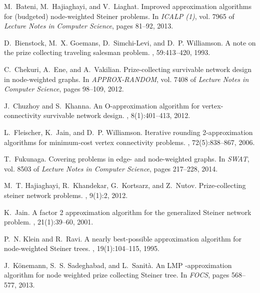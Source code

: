 \documentclass[11pt]{article}
\begin{document}
\begin{thebibliography}{10}

M.~Bateni, M.~Hajiaghayi, and V.~Liaghat.
\newblock Improved approximation algorithms for (budgeted) node-weighted
  {S}teiner problems.
\newblock In {\em ICALP (1)}, vol. 7965 of {\em Lecture Notes in Computer
  Science}, pages 81--92, 2013.

D.~Bienstock, M.~X. Goemans, D.~Simchi-Levi, and D.~P. Williamson.
\newblock A note on the prize collecting traveling salesman problem.
, 59:413--420, 1993.

C.~Chekuri, A.~Ene, and A.~Vakilian.
\newblock Prize-collecting survivable network design in node-weighted graphs.
\newblock In {\em APPROX-RANDOM}, vol. 7408 of {\em Lecture Notes in Computer
  Science}, pages 98--109, 2012.

J.~Chuzhoy and S.~Khanna.
\newblock An {O}-approximation algorithm for vertex-connectivity
  survivable network design.
, 8(1):401--413, 2012.

L.~Fleischer, K.~Jain, and D.~P. Williamson.
\newblock Iterative rounding 2-approximation algorithms for minimum-cost vertex
  connectivity problems.
, 72(5):838--867, 2006.

T.~Fukunaga.
\newblock Covering problems in edge- and node-weighted graphs.
\newblock In {\em SWAT}, vol. 8503 of {\em Lecture Notes in Computer Science},
  pages 217--228, 2014.

M.~T. Hajiaghayi, R.~Khandekar, G.~Kortsarz, and Z.~Nutov.
\newblock Prize-collecting steiner network problems.
, 9(1):2, 2012.

K.~Jain.
\newblock A factor 2 approximation algorithm for the generalized {S}teiner
  network problem.
, 21(1):39--60, 2001.

P.~N. Klein and R.~Ravi.
\newblock A nearly best-possible approximation algorithm for node-weighted
  {S}teiner trees.
, 19(1):104--115, 1995.

J.~K{\"o}nemann, S.~S. Sadeghabad, and L.~Sanit{\`a}.
\newblock An {LMP} -approximation algorithm for node weighted
  prize collecting {S}teiner tree.
\newblock In {\em FOCS}, pages 568--577, 2013.


\end{thebibliography}
\end{document}
